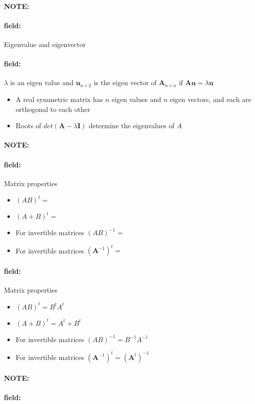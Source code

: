\documentclass[12pt]{article}
\newenvironment{note}{\paragraph{NOTE:}}{}
\newenvironment{field}{\paragraph{field:}}{}
\begin{document}
\begin{note}
  \begin{field}
    Eigenvalue and eigenvector
  \end{field}
    \begin{field}
      $\lambda $ is an eigen value and  $\mathbf{u}_{n \times 2}$ is the eigen vector of $\mathbf{A}_{n \times n}$ if $\mathbf{Au} = \lambda \mathbf{u}$
      \begin{itemize}
        \item A real symmetric matrix has $n$ eigen values  and $n$ eigen vectors, and each are orthogonal to each other
        \item Roots of $det(\mathbf{A} - \lambda  \mathbf{I})$ determine the eigenvalues of $A$
      \end{itemize}
    \end{field}
\end{note}


\begin{note}
  \begin{field}
    Matrix properties
    \begin{itemize}
      \item $(AB)^{t} = $
      \item $(A+B)^t = $
      \item For invertible matrices $(AB)^{-1} = $
      \item For invertible matrices $(\mathbf{A}^{-1})^t = $
    \end{itemize}
  \end{field}
  \begin{field}
    Matrix properties
    \begin{itemize}
      \item $(AB)^{t} = B^tA^t$
      \item $(A+B)^t = A^t + B^t$
      \item For invertible matrices $(AB)^{-1} = B^{-1}A^{-1}$
      \item For invertible matrices $(\mathbf{A}^{-1})^t = (\mathbf{A}^t)^{-1}$
    \end{itemize}
  \end{field}
\end{note}

\begin{note}
  \begin{field}

  \end{field}
\end{note}
\end{document}

